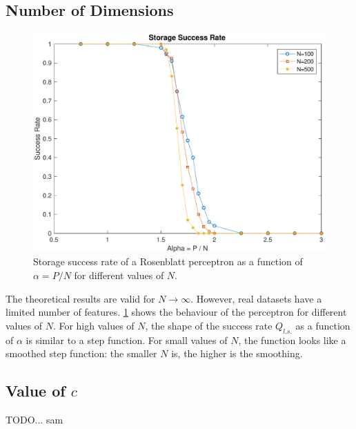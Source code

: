 \subsection{Number of Dimensions}
\label{subsec:dimensions}
\begin{figure}[t]
	\centering
	\includegraphics[width=\columnwidth]{figures/multiple_n}
    \caption{Storage success rate of a Rosenblatt perceptron as a function of $\alpha = P / N$ for different values of $N$.}
	\label{fig:multiple_n}
\end{figure}

The theoretical results are valid for $N \to \infty$.
However, real datasets have a limited number of features.
\cref{fig:multiple_n} shows the behaviour of the perceptron for different values of $N$.
For high values of $N$, the shape of the success rate $Q_{l.s.}$ as a function of $\alpha$ is similar to a step function.
For small values of $N$, the function looks like a smoothed step function:
the smaller $N$ is, the higher is the smoothing.

\subsection{Value of $c$}
\label{subsec:c}
TODO... sam

